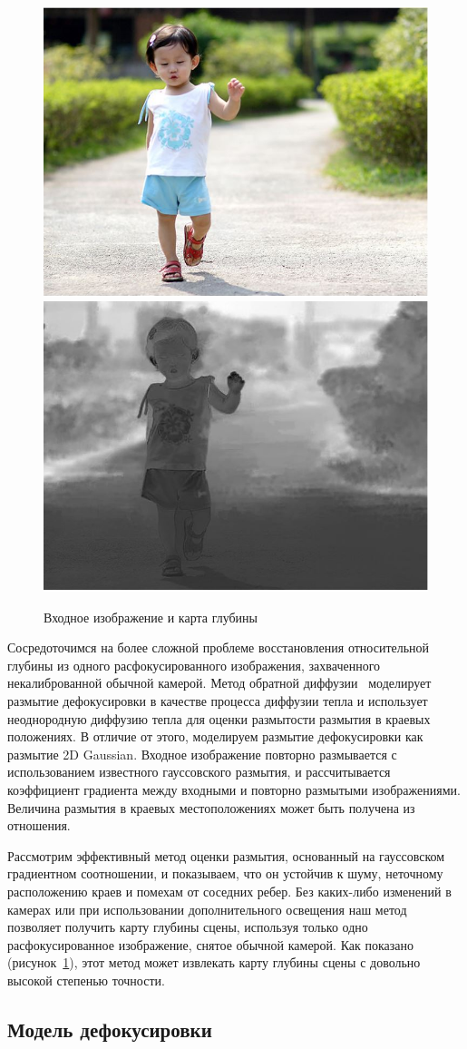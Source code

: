 \begin{figure}[H]
	\centering
	\includegraphics[width=0.4\linewidth]{pics/input}
	\includegraphics[width=0.4\linewidth]{pics/depth_map}
	\caption{Входное изображение и карта глубины}
	\label{fig:input}
\end{figure}

Сосредоточимся на более сложной проблеме восстановления относительной глубины из одного расфокусированного изображения, захваченного некалиброванной обычной камерой. Метод обратной диффузии~\cite{Proc} моделирует размытие дефокусировки в качестве процесса диффузии тепла и использует неоднородную диффузию тепла для оценки размытости размытия в краевых положениях. В отличие от этого, моделируем размытие дефокусировки как размытие 2D Gaussian. Входное изображение повторно размывается с использованием известного гауссовского размытия, и рассчитывается коэффициент градиента между входными и повторно размытыми изображениями. Величина размытия в краевых местоположениях может быть получена из отношения.

Рассмотрим эффективный метод оценки размытия, основанный на гауссовском градиентном соотношении, и показываем, что он устойчив к шуму, неточному расположению краев и помехам от соседних ребер. Без каких-либо изменений в камерах или при использовании дополнительного освещения наш метод позволяет получить карту глубины сцены, используя только одно расфокусированное изображение, снятое обычной камерой. Как показано (рисунок~\ref{fig:input}), этот метод может извлекать карту глубины сцены с довольно высокой степенью точности.

\subsection{Модель дефокусировки}

